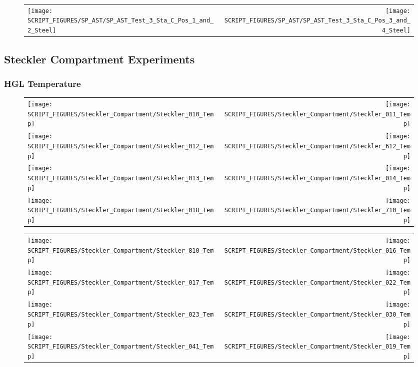 \begin{figure}[p]
\begin{tabular*}{\textwidth}{l@{\extracolsep{\fill}}r}
\texttt{[image: SCRIPT\_FIGURES/SP\_AST/SP\_AST\_Test\_3\_Sta\_C\_Pos\_1\_and\_2\_Steel]} &
\texttt{[image: SCRIPT\_FIGURES/SP\_AST/SP\_AST\_Test\_3\_Sta\_C\_Pos\_3\_and\_4\_Steel]}
\end{tabular*}
\end{figure}

\clearpage

\subsection{Steckler Compartment Experiments}

\subsubsection{HGL Temperature}

\begin{figure}[p]
\begin{tabular*}{\textwidth}{l@{\extracolsep{\fill}}r}
\texttt{[image: SCRIPT\_FIGURES/Steckler\_Compartment/Steckler\_010\_Temp]} &
\texttt{[image: SCRIPT\_FIGURES/Steckler\_Compartment/Steckler\_011\_Temp]} \\
\texttt{[image: SCRIPT\_FIGURES/Steckler\_Compartment/Steckler\_012\_Temp]} &
\texttt{[image: SCRIPT\_FIGURES/Steckler\_Compartment/Steckler\_612\_Temp]} \\
\texttt{[image: SCRIPT\_FIGURES/Steckler\_Compartment/Steckler\_013\_Temp]} &
\texttt{[image: SCRIPT\_FIGURES/Steckler\_Compartment/Steckler\_014\_Temp]} \\
\texttt{[image: SCRIPT\_FIGURES/Steckler\_Compartment/Steckler\_018\_Temp]} &
\texttt{[image: SCRIPT\_FIGURES/Steckler\_Compartment/Steckler\_710\_Temp]}
\end{tabular*}
\end{figure}

\begin{figure}[p]
\begin{tabular*}{\textwidth}{l@{\extracolsep{\fill}}r}
\texttt{[image: SCRIPT\_FIGURES/Steckler\_Compartment/Steckler\_810\_Temp]} &
\texttt{[image: SCRIPT\_FIGURES/Steckler\_Compartment/Steckler\_016\_Temp]} \\
\texttt{[image: SCRIPT\_FIGURES/Steckler\_Compartment/Steckler\_017\_Temp]} &
\texttt{[image: SCRIPT\_FIGURES/Steckler\_Compartment/Steckler\_022\_Temp]} \\
\texttt{[image: SCRIPT\_FIGURES/Steckler\_Compartment/Steckler\_023\_Temp]} &
\texttt{[image: SCRIPT\_FIGURES/Steckler\_Compartment/Steckler\_030\_Temp]} \\
\texttt{[image: SCRIPT\_FIGURES/Steckler\_Compartment/Steckler\_041\_Temp]} &
\texttt{[image: SCRIPT\_FIGURES/Steckler\_Compartment/Steckler\_019\_Temp]}
\end{tabular*}
\end{figure}

